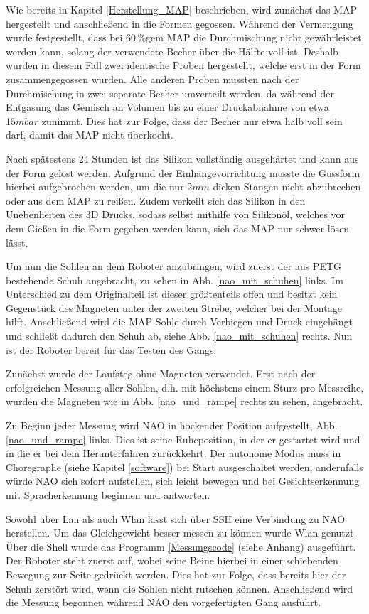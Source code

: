 Wie bereits in Kapitel \ref{Herstellung_MAP} beschrieben, wird zunächst das MAP hergestellt und anschließend in die Formen gegossen. Während der Vermengung wurde festgestellt, dass bei 60\,\%gem MAP die Durchmischung nicht gewährleistet werden kann, solang der verwendete Becher über die Hälfte voll ist. Deshalb wurden in diesem Fall zwei identische Proben hergestellt, welche erst in der Form zusammengegossen wurden. Alle anderen Proben mussten nach der Durchmischung in zwei separate Becher umverteilt werden, da während der Entgasung das Gemisch an Volumen bis zu einer Druckabnahme von etwa $15 \unit{mbar}$ zunimmt. Dies hat zur Folge, dass der Becher nur etwa halb voll sein darf, damit das MAP nicht \glqq überkocht\grqq{}. 

Nach spätestens 24 Stunden ist das Silikon vollständig ausgehärtet und kann aus der Form gelöst werden. Aufgrund der Einhängevorrichtung musste die Gussform hierbei aufgebrochen werden, um die nur $2 \unit{mm}$ dicken Stangen nicht abzubrechen oder aus dem MAP zu reißen. Zudem verkeilt sich das Silikon in den Unebenheiten des 3D Drucks, sodass selbst mithilfe von Silikonöl, welches vor dem Gießen in die Form gegeben werden kann, sich das MAP nur schwer lösen lässt. 

Um nun die Sohlen an dem Roboter anzubringen, wird zuerst der aus PETG bestehende Schuh angebracht, zu sehen in Abb. \ref{nao_mit_schuhen} links. Im Unterschied zu dem Originalteil ist dieser größtenteils offen und besitzt kein Gegenstück des Magneten unter der zweiten Strebe, welcher bei der Montage hilft. Anschließend wird die MAP Sohle durch Verbiegen und Druck eingehängt und schließt dadurch den Schuh ab, siehe Abb. \ref{nao_mit_schuhen} rechts. Nun ist der Roboter bereit für das Testen des Gangs.

Zunächst wurde der Laufsteg ohne Magneten verwendet. Erst nach der erfolgreichen Messung aller Sohlen, d.h. mit höchstens einem Sturz pro Messreihe, wurden die Magneten wie in Abb. \ref{nao_und_rampe} rechts zu sehen, angebracht. 

Zu Beginn jeder Messung wird NAO in hockender Position aufgestellt, Abb. \ref{nao_und_rampe} links. Dies ist seine Ruheposition, in der er gestartet wird und in die er bei dem Herunterfahren zurückkehrt. Der autonome Modus muss in Choregraphe (siehe Kapitel \ref{software}) bei Start ausgeschaltet werden, andernfalls würde NAO sich sofort aufstellen, sich leicht bewegen und bei Gesichtserkennung mit Spracherkennung beginnen und antworten. 

Sowohl über Lan als auch Wlan lässt sich über SSH eine Verbindung zu NAO herstellen. Um das Gleichgewicht besser messen zu können wurde Wlan genutzt. Über die Shell wurde das Programm \ref{Messungscode} (siehe Anhang) ausgeführt. Der Roboter steht zuerst auf, wobei seine Beine hierbei in einer schiebenden Bewegung zur Seite gedrückt werden. Dies hat zur Folge, dass bereits hier der Schuh zerstört wird, wenn die Sohlen nicht rutschen können. Anschließend wird die Messung begonnen während NAO den vorgefertigten Gang ausführt. 

